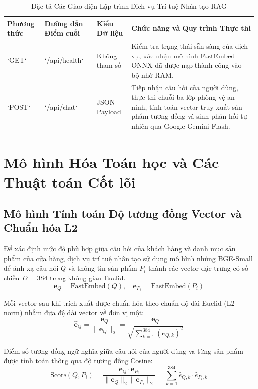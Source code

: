 \begin{table}[H]
\centering
\caption{Đặc tả Các Giao diện Lập trình Dịch vụ Trí tuệ Nhân tạo RAG}
\label{tab:api_rag}
\begin{tabularx}{\textwidth}{p{1.8cm}p{3.5cm}p{2.2cm}X}
\toprule
\textbf{Phương thức} & \textbf{Đường dẫn Điểm cuối} & \textbf{Kiểu Dữ liệu} & \textbf{Chức năng và Quy trình Thực thi} \\
\midrule
`GET` & `/api/health` & Không tham số & Kiểm tra trạng thái sẵn sàng của dịch vụ, xác nhận mô hình FastEmbed ONNX đã được nạp thành công vào bộ nhớ RAM. \\
\addlinespace
`POST` & `/api/chat` & JSON Payload & Tiếp nhận câu hỏi của người dùng, thực thi chuỗi ba lớp phòng vệ an ninh, tính toán vector truy xuất sản phẩm tương đồng và sinh phản hồi tự nhiên qua Google Gemini Flash. \\
\bottomrule
\end{tabularx}
\end{table}

\section{Mô hình Hóa Toán học và Các Thuật toán Cốt lõi}

\subsection{Mô hình Tính toán Độ tương đồng Vector và Chuẩn hóa L2}
Để xác định mức độ phù hợp giữa câu hỏi của khách hàng và danh mục sản phẩm của cửa hàng, dịch vụ trí tuệ nhân tạo sử dụng mô hình nhúng BGE-Small để ánh xạ câu hỏi $Q$ và thông tin sản phẩm $P_i$ thành các vector đặc trưng có số chiều $D = 384$ trong không gian Euclid:
\begin{equation}
\mathbf{e}_Q = \text{FastEmbed}(Q), \quad \mathbf{e}_{P_i} = \text{FastEmbed}(P_i)
\end{equation}

Mỗi vector sau khi trích xuất được chuẩn hóa theo chuẩn độ dài Euclid (L2-norm) nhằm đưa độ dài vector về đơn vị một:
\begin{equation}
\hat{\mathbf{e}}_Q = \frac{\mathbf{e}_Q}{\|\mathbf{e}_Q\|_2} = \frac{\mathbf{e}_Q}{\sqrt{\sum_{k=1}^{384} (e_{Q,k})^2}}
\end{equation}

Điểm số tương đồng ngữ nghĩa giữa câu hỏi của người dùng và từng sản phẩm được tính toán thông qua độ tương đồng Cosine:
\begin{equation}
\text{Score}(Q, P_i) = \frac{\mathbf{e}_Q \cdot \mathbf{e}_{P_i}}{\|\mathbf{e}_Q\|_2 \|\mathbf{e}_{P_i}\|_2} = \sum_{k=1}^{384} \hat{e}_{Q,k} \cdot \hat{e}_{P_i,k}
\end{equation}

